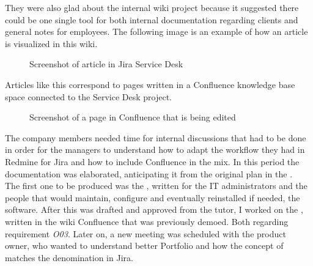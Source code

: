 	They were also glad about the internal wiki project because it suggested there could be one single tool for both internal documentation regarding clients and general notes for employees.
	The following image is an example of how an article is visualized in this wiki.
	\begin{figure}[H]
		\centering
		\caption{Screenshot of article in Jira Service Desk}
	\end{figure}
	Articles like this correspond to pages written in a Confluence knowledge base space connected to the Service Desk project.
	\begin{figure}[H]
		\centering
		\caption{Screenshot of a page in Confluence that is being edited}
	\end{figure}
	The company members needed time for internal discussions that had to be done in order for the managers to understand how to adapt the workflow they had in Redmine for Jira and how to include Confluence in the mix.
	In this period the documentation was elaborated, anticipating it from the original plan in the .\\
	The first one to be produced was the , written for the IT administrators and the people that would maintain, configure and eventually reinstalled if needed, the software.
	After this was drafted and approved from the tutor, I worked on the , written in the wiki Confluence that was previously demoed.
	Both regarding requirement \textit{O03}.
	Later on, a new meeting was scheduled with the product owner, who wanted to understand better Portfolio and how the concept of  matches the  denomination in Jira.\\
